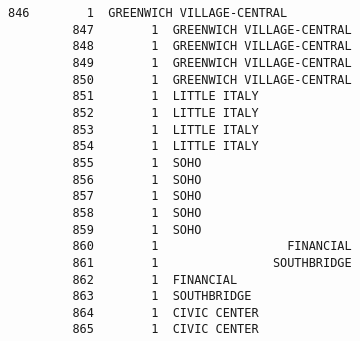 \documentclass[11pt]{article}
\begin{document}
\begin{Verbatim}[commandchars=\\\{\}]
         846        1  GREENWICH VILLAGE-CENTRAL   
         847        1  GREENWICH VILLAGE-CENTRAL   
         848        1  GREENWICH VILLAGE-CENTRAL   
         849        1  GREENWICH VILLAGE-CENTRAL   
         850        1  GREENWICH VILLAGE-CENTRAL   
         851        1  LITTLE ITALY                
         852        1  LITTLE ITALY                
         853        1  LITTLE ITALY                
         854        1  LITTLE ITALY                
         855        1  SOHO                        
         856        1  SOHO                        
         857        1  SOHO                        
         858        1  SOHO                        
         859        1  SOHO                        
         860        1                  FINANCIAL   
         861        1                SOUTHBRIDGE   
         862        1  FINANCIAL                   
         863        1  SOUTHBRIDGE                 
         864        1  CIVIC CENTER                
         865        1  CIVIC CENTER                
         

\end{Verbatim}
\end{document}
